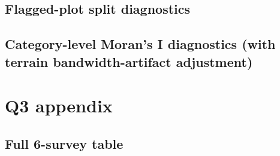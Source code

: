 \subsection{Flagged-plot split diagnostics}
\label{app:flagged-plot-split}

\subsection{Category-level Moran's I diagnostics (with terrain bandwidth-artifact adjustment)}
\label{app:results-q2-category-morans-i}

\section{Q3 appendix}
\label{app:results-q3}

\subsection{Full 6-survey table}
\label{app:results-q3-6survey}

